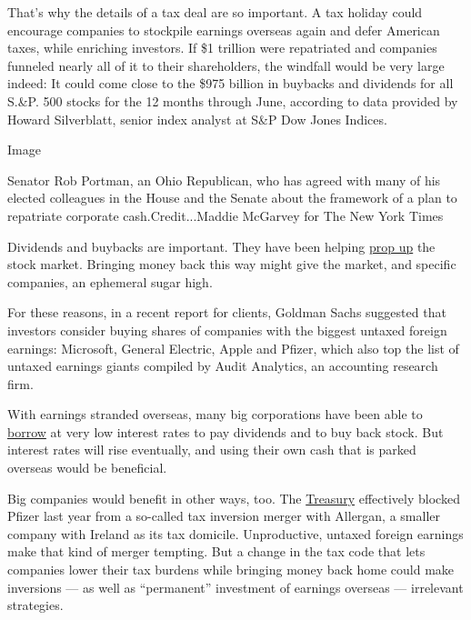 That's why the details of a tax deal are so important. A tax holiday
could encourage companies to stockpile earnings overseas again and defer
American taxes, while enriching investors. If \$1 trillion were
repatriated and companies funneled nearly all of it to their
shareholders, the windfall would be very large indeed: It could come
close to the \$975 billion in buybacks and dividends for all S.\&P. 500
stocks for the 12 months through June, according to data provided by
Howard Silverblatt, senior index analyst at S\&P Dow Jones Indices.

Image

Senator Rob Portman, an Ohio Republican, who has agreed with many of his
elected colleagues in the House and the Senate about the framework of a
plan to repatriate corporate cash.Credit...Maddie McGarvey for The New
York Times

Dividends and buybacks are important. They have been helping
\href{http://www.nytimes.com/2016/08/28/your-money/some-good-news-for-investors-the-bull-may-still-have-spring-in-its-step.html}{prop
up} the stock market. Bringing money back this way might give the
market, and specific companies, an ephemeral sugar high.

For these reasons, in a recent report for clients, Goldman Sachs
suggested that investors consider buying shares of companies with the
biggest untaxed foreign earnings: Microsoft, General Electric, Apple and
Pfizer, which also top the list of untaxed earnings giants compiled by
Audit Analytics, an accounting research firm.

With earnings stranded overseas, many big corporations have been able to
\href{http://www.nytimes.com/2015/11/08/your-money/microsofts-stock-math-fewer-shares-pricier-shares.html}{borrow}
at very low interest rates to pay dividends and to buy back stock. But
interest rates will rise eventually, and using their own cash that is
parked overseas would be beneficial.

Big companies would benefit in other ways, too. The
\href{http://www.nytimes.com/2016/10/14/business/dealbook/exemptions-made-to-treasurys-tax-saving-restriction-rules.html}{Treasury}
effectively blocked Pfizer last year from a so-called tax inversion
merger with Allergan, a smaller company with Ireland as its tax
domicile. Unproductive, untaxed foreign earnings make that kind of
merger tempting. But a change in the tax code that lets companies lower
their tax burdens while bringing money back home could make inversions
--- as well as ``permanent'' investment of earnings overseas ---
irrelevant strategies.

